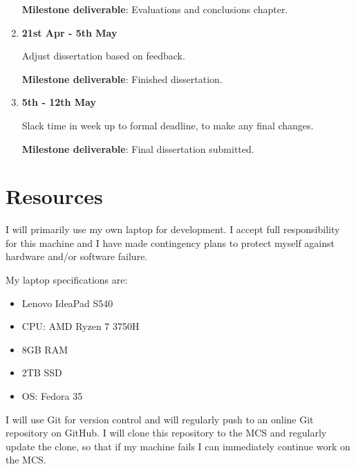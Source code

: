 \begin{enumerate}
  \textbf{Milestone deliverable}: Evaluations and conclusions chapter.

\item\textbf{21st Apr - 5th May}

  Adjust dissertation based on feedback.

  \textbf{Milestone deliverable}: Finished dissertation.

\item \textbf{5th - 12th May}

  Slack time in week up to formal deadline, to make any final changes.

  \textbf{Milestone deliverable}: Final dissertation submitted.

\end{enumerate}

\section*{Resources}

I will primarily use my own laptop for development. I accept full responsibility for this machine and I have made contingency plans to protect myself against hardware and/or software failure.

My laptop specifications are:
\begin{itemize}
\item Lenovo IdeaPad S540
\item CPU: AMD Ryzen 7 3750H
\item 8GB RAM
\item 2TB SSD
\item OS: Fedora 35
\end{itemize}

I will use Git for version control and will regularly push to an online Git repository on GitHub. I will clone this repository to the MCS and regularly update the clone, so that if my machine fails I can immediately continue work on the MCS.


